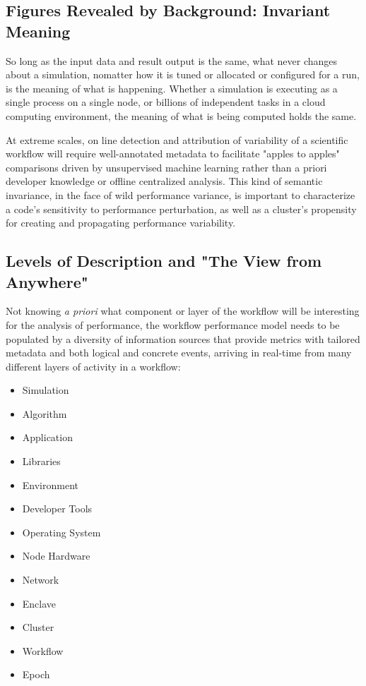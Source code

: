\subsection{Figures Revealed by Background: Invariant Meaning}
So long as the input data and result output is the same, what never
changes about a simulation, nomatter how it is tuned or allocated or
configured for a run, is the meaning of what is happening.  Whether a
simulation is executing as a single process on a single node, or
billions of independent tasks in a cloud computing environment, the
meaning of what is being computed holds the same.

At extreme scales, on line detection and attribution of variability of
a scientific workflow will require well-annotated metadata to
facilitate "apples to apples" comparisons driven by unsupervised
machine learning rather than a priori developer knowledge or offline
centralized analysis. This kind of semantic invariance, in the face of
wild performance variance, is important to characterize a code's
sensitivity to performance perturbation, as well as a cluster's
propensity for creating and propagating performance variability.


\subsection{Levels of Description and "The View from Anywhere"}
Not knowing \textit{a priori} what component or layer of the workflow
will be interesting for the analysis of performance, the workflow
performance model needs to be populated by a diversity of information
sources that provide metrics with tailored metadata and both logical
and concrete events, arriving in real-time from many different layers
of activity in a workflow:
\begin{itemize}
    \item Simulation
    \item Algorithm
    \item Application
    \item Libraries
    \item Environment
    \item Developer Tools
    \item Operating System
    \item Node Hardware
    \item Network
    \item Enclave
    \item Cluster
    \item Workflow
    \item Epoch	
\end{itemize}

